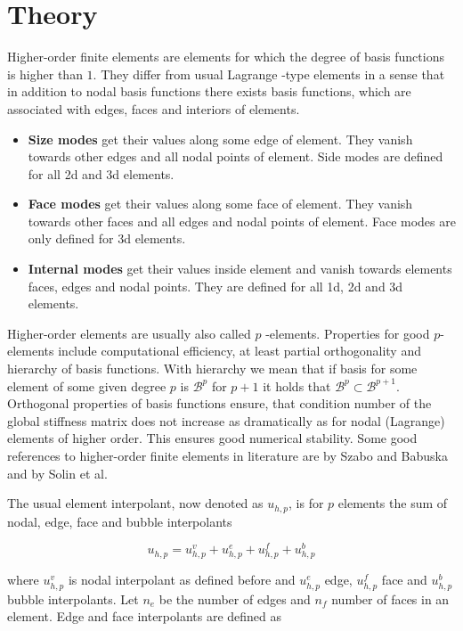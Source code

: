 
\section{Theory}

Higher-order finite elements are elements for which the degree of basis functions is higher than $1$. They differ from usual Lagrange -type elements in a sense that in addition to nodal basis functions there exists basis functions, which are associated with edges, faces and interiors of elements.

\begin{itemize}
\item \textbf{Size modes} get their values along some edge of element. They vanish towards other edges and all nodal points of element. Side modes are defined for all 2d and 3d elements. 
\item \textbf{Face modes} get their values along some face of element. They vanish towards other faces and all edges and nodal points of element. Face modes are only defined for 3d elements. 
\item \textbf{Internal modes} get their values inside element and vanish towards elements faces, edges and nodal points. They are defined for all 1d, 2d and 3d elements. 
\end{itemize}

Higher-order elements are usually also called $p$ -elements. Properties for good $p$-elements include computational efficiency, at least partial orthogonality and hierarchy of basis functions. With hierarchy we mean that if basis for some element of some given degree $p$ is $\mathcal{B}^p$ for $p+1$ it holds that $\mathcal{B}^p \subset \mathcal{B}^{p+1}$. Orthogonal properties of basis functions ensure, that condition number of the global stiffness matrix does not increase as dramatically as for nodal (Lagrange) elements of higher order. This ensures good numerical stability. Some good references to higher-order finite elements in literature are \cite{SzaboBabu} by Szabo and Babuska and \cite{Solin} by Solin et al. 

The usual element interpolant, now denoted as $u_{h,p}$, is for $p$ elements the sum of nodal, edge, face and bubble interpolants

\begin{equation}
 u_{h,p}=u_{h,p}^v+u_{h,p}^e+u_{h,p}^f+u_{h,p}^b
\end{equation}

\noindent where $u_{h,p}^v$ is nodal interpolant as defined before and $u_{h,p}^e$ edge, $u_{h,p}^f$ face and $u_{h,p}^b$ bubble interpolants. Let $n_e$ be the number of edges and $n_f$ number of faces in an element. Edge and face interpolants are defined as

